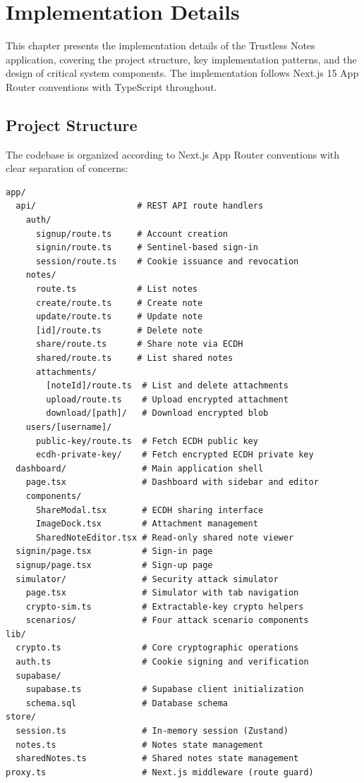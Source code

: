 
\chapter{Implementation Details}

This chapter presents the implementation details of the Trustless Notes application, covering the project structure, key implementation patterns, and the design of critical system components. The implementation follows Next.js 15 App Router conventions with TypeScript throughout.

\section{Project Structure}

The codebase is organized according to Next.js App Router conventions with clear separation of concerns:

\begin{verbatim}
app/
  api/                    # REST API route handlers
    auth/
      signup/route.ts     # Account creation
      signin/route.ts     # Sentinel-based sign-in
      session/route.ts    # Cookie issuance and revocation
    notes/
      route.ts            # List notes
      create/route.ts     # Create note
      update/route.ts     # Update note
      [id]/route.ts       # Delete note
      share/route.ts      # Share note via ECDH
      shared/route.ts     # List shared notes
      attachments/
        [noteId]/route.ts  # List and delete attachments
        upload/route.ts    # Upload encrypted attachment
        download/[path]/   # Download encrypted blob
    users/[username]/
      public-key/route.ts  # Fetch ECDH public key
      ecdh-private-key/    # Fetch encrypted ECDH private key
  dashboard/               # Main application shell
    page.tsx               # Dashboard with sidebar and editor
    components/
      ShareModal.tsx       # ECDH sharing interface
      ImageDock.tsx        # Attachment management
      SharedNoteEditor.tsx # Read-only shared note viewer
  signin/page.tsx          # Sign-in page
  signup/page.tsx          # Sign-up page
  simulator/               # Security attack simulator
    page.tsx               # Simulator with tab navigation
    crypto-sim.ts          # Extractable-key crypto helpers
    scenarios/             # Four attack scenario components
lib/
  crypto.ts                # Core cryptographic operations
  auth.ts                  # Cookie signing and verification
  supabase/
    supabase.ts            # Supabase client initialization
    schema.sql             # Database schema
store/
  session.ts               # In-memory session (Zustand)
  notes.ts                 # Notes state management
  sharedNotes.ts           # Shared notes state management
proxy.ts                   # Next.js middleware (route guard)
\end{verbatim}

